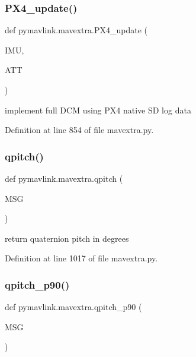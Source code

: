 \subsubsection{\texorpdfstring{PX4\_update()}{PX4\_update()}}
{\footnotesize\ttfamily def pymavlink.\+mavextra.\+P\+X4\+\_\+update (\begin{DoxyParamCaption}\item[{}]{I\+MU,  }\item[{}]{A\+TT }\end{DoxyParamCaption})}

\begin{DoxyVerb}implement full DCM using PX4 native SD log data\end{DoxyVerb}
 

Definition at line 854 of file mavextra.\+py.

\mbox{\label{namespacepymavlink_1_1mavextra_abdee678a41670fcef22b100ca3ce611d}} 
\subsubsection{\texorpdfstring{qpitch()}{qpitch()}}
{\footnotesize\ttfamily def pymavlink.\+mavextra.\+qpitch (\begin{DoxyParamCaption}\item[{}]{M\+SG }\end{DoxyParamCaption})}

\begin{DoxyVerb}return quaternion pitch in degrees\end{DoxyVerb}
 

Definition at line 1017 of file mavextra.\+py.

\mbox{\label{namespacepymavlink_1_1mavextra_a260bdd8eafc90dc550972d28ba227c1a}} 
\subsubsection{\texorpdfstring{qpitch\_p90()}{qpitch\_p90()}}
{\footnotesize\ttfamily def pymavlink.\+mavextra.\+qpitch\+\_\+p90 (\begin{DoxyParamCaption}\item[{}]{M\+SG }\end{DoxyParamCaption})}

